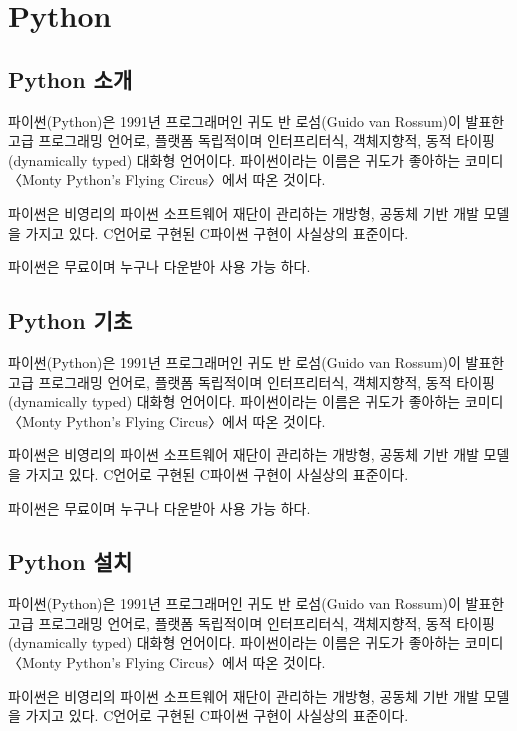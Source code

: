 \section{Python}

\subsection{Python 소개}

파이썬(Python)은 1991년 프로그래머인 귀도 반 로섬(Guido van Rossum)이 발표한 고급 프로그래밍 언어로, 플랫폼 독립적이며 인터프리터식, 객체지향적, 동적 타이핑(dynamically typed) 대화형 언어이다. 파이썬이라는 이름은 귀도가 좋아하는 코미디 〈Monty Python's Flying Circus〉에서 따온 것이다.

파이썬은 비영리의 파이썬 소프트웨어 재단이 관리하는 개방형, 공동체 기반 개발 모델을 가지고 있다. C언어로 구현된 C파이썬 구현이 사실상의 표준이다.

파이썬은 무료이며 누구나 다운받아 사용 가능 하다.

\subsection{Python 기초}

파이썬(Python)은 1991년 프로그래머인 귀도 반 로섬(Guido van Rossum)이 발표한 고급 프로그래밍 언어로, 플랫폼 독립적이며 인터프리터식, 객체지향적, 동적 타이핑(dynamically typed) 대화형 언어이다. 파이썬이라는 이름은 귀도가 좋아하는 코미디 〈Monty Python's Flying Circus〉에서 따온 것이다.

파이썬은 비영리의 파이썬 소프트웨어 재단이 관리하는 개방형, 공동체 기반 개발 모델을 가지고 있다. C언어로 구현된 C파이썬 구현이 사실상의 표준이다.

파이썬은 무료이며 누구나 다운받아 사용 가능 하다.


\subsection{Python 설치}

파이썬(Python)은 1991년 프로그래머인 귀도 반 로섬(Guido van Rossum)이 발표한 고급 프로그래밍 언어로, 플랫폼 독립적이며 인터프리터식, 객체지향적, 동적 타이핑(dynamically typed) 대화형 언어이다. 파이썬이라는 이름은 귀도가 좋아하는 코미디 〈Monty Python's Flying Circus〉에서 따온 것이다.

파이썬은 비영리의 파이썬 소프트웨어 재단이 관리하는 개방형, 공동체 기반 개발 모델을 가지고 있다. C언어로 구현된 C파이썬 구현이 사실상의 표준이다.

